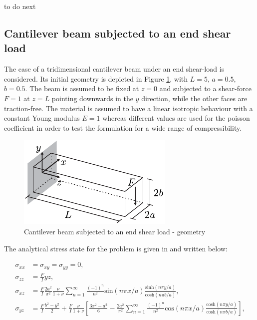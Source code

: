 \documentclass[english,11pt,3p,number,sort&compress]{elsarticle}
\newcommand{\giovane}{\color{red}{\bf\Large GA} \color{cyan} }
\begin{document}
{\giovane to do next}

\subsection{Cantilever beam subjected to an end shear load \label{subsec:bishop}}

The case of a tridimensional cantilever beam under an end shear-load is considered. Its initial geometry is depicted in Figure \ref{fig:bishop-beam-geometry}, with $L=5$, $a=0.5$, $b=0.5$. The beam is assumed to be fixed at $z=0$ and subjected to a shear-force $F=1$ at $z=L$ pointing downwards in the $y$ direction, while the other faces are traction-free. The material is assumed to have a linear isotropic behaviour with a constant Young modulus $E=1$ whereas different values are used for the poisson coefficient in order to test the formulation for a wide range of compressibility.

\begin{figure}[H]
	\centering
	\includegraphics[scale=1.0]{bishop-beam-geometry}
	\caption{Cantilever beam subjected to an end shear load - geometry}
	\label{fig:bishop-beam-geometry}
\end{figure}

The analytical stress state for the problem is given in \cite{bishop2014displacement} and written below:

\begin{equation} \label{eq:bishop-stress}
	\begin{aligned}
		\sigma_{xx} &= \sigma_{xy} = \sigma_{yy} = 0 \text{,}\\
		\sigma_{zz} &= \frac{F}{I} yz \text{,}\\
		\sigma_{xz} &= \frac{F}{I} \frac{2a^2}{\pi^2}\frac{\nu}{1+\nu} \sum_{n=1}^{\infty} \frac{(-1)^n}{n^2} \text{sin}\left(n\pi x/a\right) \frac{\text{sinh}\left( n\pi y/a \right)}{\text{cosh}\left( n\pi b/a \right)} \text{,}\\
		\sigma_{yz} &= \frac{F}{I} \frac{b^2-y^2}{2} + \frac{F}{I}\frac{\nu}{1+\nu} \left[ \frac{3x^2-a^2}{6} - \frac{2a^2}{\pi^2} \sum_{n=1}^{\infty} \frac{(-1)^n}{n^2} \text{cos}\left(n\pi x/a\right) \frac{\text{cosh}\left( n\pi y/a \right)}{\text{cosh}\left( n\pi b/a \right)}  \right]\text{,}\\
	\end{aligned}
\end{equation}
\end{document}

